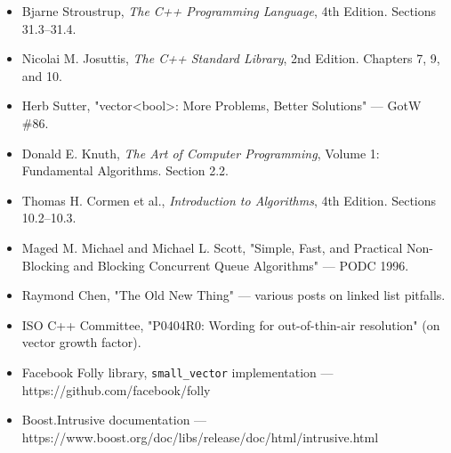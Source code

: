 \begin{itemize}
\item Bjarne Stroustrup, \textit{The C++ Programming Language}, 4th Edition. Sections 31.3–31.4.
\item Nicolai M. Josuttis, \textit{The C++ Standard Library}, 2nd Edition. Chapters 7, 9, and 10.
\item Herb Sutter, "vector<bool>: More Problems, Better Solutions" — GotW \#86.
\item Donald E. Knuth, \textit{The Art of Computer Programming}, Volume 1: Fundamental Algorithms. Section 2.2.
\item Thomas H. Cormen et al., \textit{Introduction to Algorithms}, 4th Edition. Sections 10.2–10.3.
\item Maged M. Michael and Michael L. Scott, "Simple, Fast, and Practical Non-Blocking and Blocking Concurrent Queue Algorithms" — PODC 1996.
\item Raymond Chen, "The Old New Thing" — various posts on linked list pitfalls.
\item ISO C++ Committee, "P0404R0: Wording for out-of-thin-air resolution" (on vector growth factor).
\item Facebook Folly library, \texttt{small\_vector} implementation — https://github.com/facebook/folly
\item Boost.Intrusive documentation — https://www.boost.org/doc/libs/release/doc/html/intrusive.html
\end{itemize}

